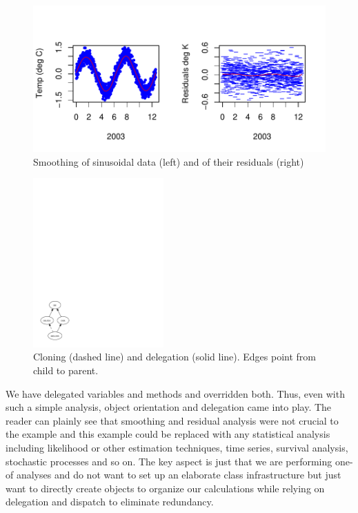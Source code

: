 \documentclass{Z}
\begin{document}
\begin{Schunk}
\end{Schunk}


\begin{figure}[tbp]
\begin{center}
\includegraphics[width=\textwidth]{proto-smoothing10}
\caption{Smoothing of sinusoidal data (left)
and of their residuals (right)}\label{fig:smoothing10}
\end{center}
\end{figure}

\begin{figure}[h!]
\begin{center}
\includegraphics[width=50mm]{cloning3.pdf}
\caption{Cloning (dashed line) and delegation (solid line).  Edges point 
from child to parent.}\label{fig:cloning}
\end{center}
\end{figure}

We have delegated variables
and methods and overridden both.  
Thus, even with such a simple analysis, object orientation
and delegation came into play.    
The reader can plainly see that smoothing and residual
analysis were not crucial to the example and this example
could be replaced with any statistical analysis including
likelihood or other estimation techniques, time series, survival
analysis, stochastic processes and so on.  The key aspect is
just that we are performing one-of analyses and do not want to
set up an elaborate class infrastructure but just want to 
directly create objects to organize our calculations while
relying on delegation and dispatch to eliminate redundancy.
\end{document}
